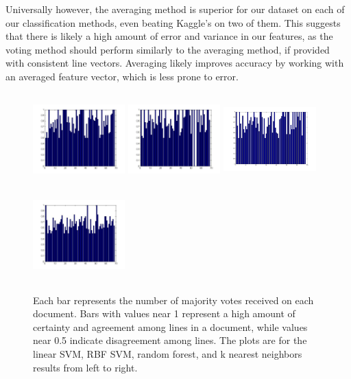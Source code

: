\documentclass[paper=a4, fontsize=11pt]{scrartcl} %
\numberwithin{equation}{section} %
\numberwithin{figure}{section} %
\numberwithin{table}{section} %
\begin{document}
Universally however, the averaging method is superior for our dataset
on each of our classification methods, even beating Kaggle's on two of
them. This suggests that there is likely a high amount of error and
variance in our features, as the voting method should perform
similarly to the averaging method, if provided with consistent line
vectors. Averaging likely improves accuracy by working with an
averaged feature vector, which is less prone to error.

\begin{figure}
  \centering
  \includegraphics[width=1.4in,height=1.4in]{linearSVMVoteDistribution.jpg}
  \includegraphics[width=1.4in,height=1.4in]{rbfSVMVoteDistribution.jpg}
  \includegraphics[width=1.4in,height=1.4in]{randForestVoteDistribution.jpg}
  \includegraphics[width=1.4in,height=1.4in]{kNNVoteDistribution.jpg}
  \caption{Each bar represents the number of majority votes received
    on each document. Bars with values near 1 represent a high amount
    of certainty and agreement among lines in a document, while values
    near 0.5 indicate disagreement among lines. The plots are for the
    linear SVM, RBF SVM, random forest, and k nearest neighbors
    results from left to right.}
  \label{fig:votes}
\end{figure}
\end{document}
